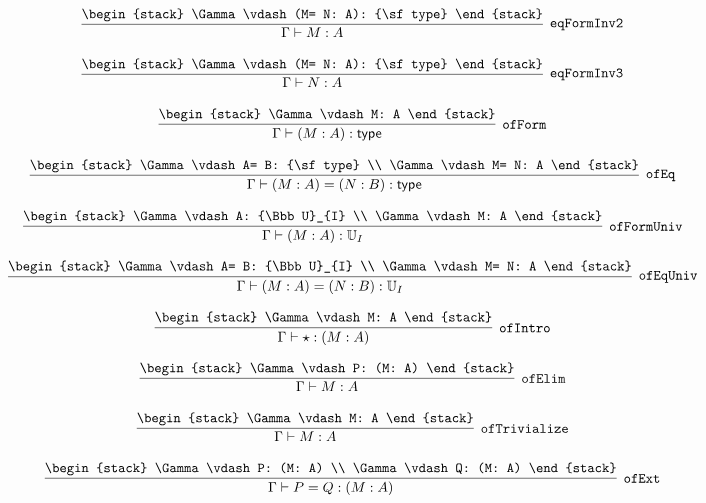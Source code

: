 \[
\infer[{\tt eqFormInv2}]{\Gamma \vdash M: A}{
\begin{stack}
\Gamma \vdash (M= N: A): {\sf type}
\end{stack}}
\]

\[
\infer[{\tt eqFormInv3}]{\Gamma \vdash N: A}{
\begin{stack}
\Gamma \vdash (M= N: A): {\sf type}
\end{stack}}
\]

\[
\infer[{\tt ofForm}]{\Gamma \vdash (M: A): {\sf type}}{
\begin{stack}
\Gamma \vdash M: A
\end{stack}}
\]

\[
\infer[{\tt ofEq}]{\Gamma \vdash (M: A)= (N: B): {\sf type}}{
\begin{stack}
\Gamma \vdash A= B: {\sf type}
\\
\Gamma \vdash M= N: A
\end{stack}}
\]

\[
\infer[{\tt ofFormUniv}]{\Gamma \vdash (M: A): {\Bbb U}_{I}}{
\begin{stack}
\Gamma \vdash A: {\Bbb U}_{I}
\\
\Gamma \vdash M: A
\end{stack}}
\]

\[
\infer[{\tt ofEqUniv}]{\Gamma \vdash (M: A)= (N: B): {\Bbb U}_{I}}{
\begin{stack}
\Gamma \vdash A= B: {\Bbb U}_{I}
\\
\Gamma \vdash M= N: A
\end{stack}}
\]

\[
\infer[{\tt ofIntro}]{\Gamma \vdash \star : (M: A)}{
\begin{stack}
\Gamma \vdash M: A
\end{stack}}
\]

\[
\infer[{\tt ofElim}]{\Gamma \vdash M: A}{
\begin{stack}
\Gamma \vdash P: (M: A)
\end{stack}}
\]

\[
\infer[{\tt ofTrivialize}]{\Gamma \vdash M: A}{
\begin{stack}
\Gamma \vdash M: A
\end{stack}}
\]

\[
\infer[{\tt ofExt}]{\Gamma \vdash P= Q: (M: A)}{
\begin{stack}
\Gamma \vdash P: (M: A)
\\
\Gamma \vdash Q: (M: A)
\end{stack}}
\]

